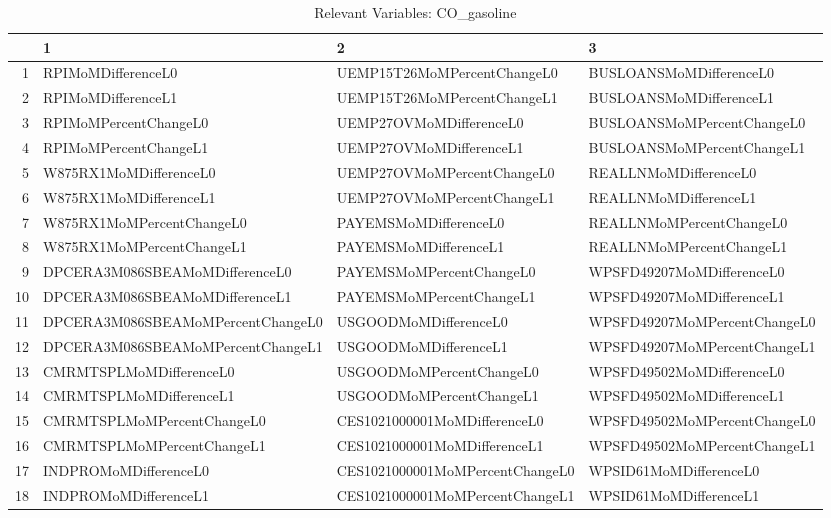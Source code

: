 \begin{longtable}{rlll}
\caption{Relevant Variables: CO_gasoline} \\ 
  \hline
 & 1 & 2 & 3 \\ 
  \hline
1 & RPIMoMDifferenceL0 & UEMP15T26MoMPercentChangeL0 & BUSLOANSMoMDifferenceL0 \\ 
  2 & RPIMoMDifferenceL1 & UEMP15T26MoMPercentChangeL1 & BUSLOANSMoMDifferenceL1 \\ 
  3 & RPIMoMPercentChangeL0 & UEMP27OVMoMDifferenceL0 & BUSLOANSMoMPercentChangeL0 \\ 
  4 & RPIMoMPercentChangeL1 & UEMP27OVMoMDifferenceL1 & BUSLOANSMoMPercentChangeL1 \\ 
  5 & W875RX1MoMDifferenceL0 & UEMP27OVMoMPercentChangeL0 & REALLNMoMDifferenceL0 \\ 
  6 & W875RX1MoMDifferenceL1 & UEMP27OVMoMPercentChangeL1 & REALLNMoMDifferenceL1 \\ 
  7 & W875RX1MoMPercentChangeL0 & PAYEMSMoMDifferenceL0 & REALLNMoMPercentChangeL0 \\ 
  8 & W875RX1MoMPercentChangeL1 & PAYEMSMoMDifferenceL1 & REALLNMoMPercentChangeL1 \\ 
  9 & DPCERA3M086SBEAMoMDifferenceL0 & PAYEMSMoMPercentChangeL0 & WPSFD49207MoMDifferenceL0 \\ 
  10 & DPCERA3M086SBEAMoMDifferenceL1 & PAYEMSMoMPercentChangeL1 & WPSFD49207MoMDifferenceL1 \\ 
  11 & DPCERA3M086SBEAMoMPercentChangeL0 & USGOODMoMDifferenceL0 & WPSFD49207MoMPercentChangeL0 \\ 
  12 & DPCERA3M086SBEAMoMPercentChangeL1 & USGOODMoMDifferenceL1 & WPSFD49207MoMPercentChangeL1 \\ 
  13 & CMRMTSPLMoMDifferenceL0 & USGOODMoMPercentChangeL0 & WPSFD49502MoMDifferenceL0 \\ 
  14 & CMRMTSPLMoMDifferenceL1 & USGOODMoMPercentChangeL1 & WPSFD49502MoMDifferenceL1 \\ 
  15 & CMRMTSPLMoMPercentChangeL0 & CES1021000001MoMDifferenceL0 & WPSFD49502MoMPercentChangeL0 \\ 
  16 & CMRMTSPLMoMPercentChangeL1 & CES1021000001MoMDifferenceL1 & WPSFD49502MoMPercentChangeL1 \\ 
  17 & INDPROMoMDifferenceL0 & CES1021000001MoMPercentChangeL0 & WPSID61MoMDifferenceL0 \\ 
  18 & INDPROMoMDifferenceL1 & CES1021000001MoMPercentChangeL1 & WPSID61MoMDifferenceL1 \\ 

\end{longtable}
